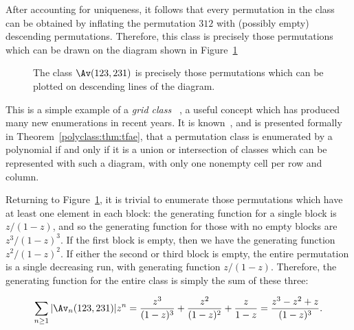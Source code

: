 \documentclass[12pt,twoside]{memoir}
\begin{document}
      After accounting for uniqueness, it follows that every permutation in the
      class can be obtained by inflating the permutation $312$ with (possibly
      empty) descending permutations. Therefore, this class is precisely those
      permutations which can be drawn on the diagram shown in
      Figure~\ref{prelim:fig:polygrid}


      \begin{figure}[t] \centering
      \caption{The class $\Av(123, 231)$ is precisely those permutations which can be
               plotted on descending lines of the diagram.}
      \label{prelim:fig:polygrid}
      \end{figure}

      This is a simple example of a \emph{grid class}
      ~\cite{MurphyVatter}, a useful concept which has produced many new
      enumerations in recent years. It is known~\cite{SophieVince,GridClasses},
      and is presented formally in Theorem~\ref{polyclass:thm:tfae}, that a
      permutation class is enumerated by a polynomial if and only if it is a
      union or intersection of classes which can be represented with such a
      diagram, with only one nonempty cell per row and column. 

      Returning to Figure~\ref{prelim:fig:polygrid}, it is trivial to enumerate
      those permutations which have at least one element in each block: the
      generating function for a single block is $z/(1-z)$, and so the
      generating function for those with no empty blocks are
      $z^3/(1-z)^3$. If the first block is empty, then we have the
      generating function $z^2/(1-z)^2$. If either the second or third
      block is empty, the entire permutation is a single decreasing run, with
      generating function $z/(1-z)$. Therefore, the generating function for
      the entire class is simply the sum of these three:

      \begin{equation} \label{prelim:eqn:polyclass}
        \sum_{n \geq 1} |\Av_n (123,231)| z^n = 
          \frac{z^3}{(1-z)^3} + \frac{z^2}{(1-z)^2} + \frac{z}{1-z} =
          \frac{z^3- z^2 + z}{(1-z)^3}.
      \end{equation}
\end{document}
